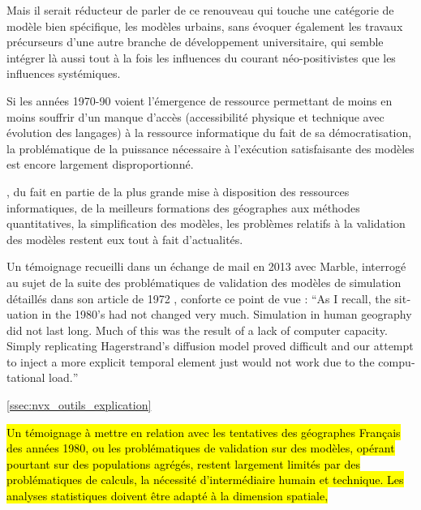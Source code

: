 Mais il serait réducteur de parler de ce renouveau qui touche une catégorie de modèle bien spécifique, les modèles urbains, sans évoquer également les travaux précurseurs d'une autre branche de développement universitaire, qui semble intégrer là aussi tout à la fois les influences du courant néo-positivistes que les influences systémiques. %

Si les années 1970-90 voient l'émergence de ressource permettant de moins en moins souffrir d'un manque d'accès (accessibilité physique et technique avec évolution des langages) à la ressource informatique du fait de sa démocratisation, la problématique de la puissance nécessaire à l’exécution satisfaisante des modèles est encore largement disproportionné. 

, du fait en partie de la plus grande mise à disposition des ressources informatiques, de la meilleurs formations des géographes aux méthodes quantitatives, la simplification des modèles, les problèmes relatifs à la validation des modèles restent eux tout à fait d'actualités. 

Un témoignage recueilli dans un échange de mail en 2013 avec Marble, interrogé au sujet de la suite des problématiques de validation des modèles de simulation détaillés dans son article de 1972 \autocite{Marble1972}, conforte ce point de vue : \foreignquote{english}{As I recall, the situation in the 1980's had not changed very much. Simulation in human geography did not last long. Much of this was the result of a lack of computer capacity. Simply replicating Hagerstrand's diffusion model proved difficult and our attempt to inject a more explicit temporal element just would not work due to the computational load.}

\ref{ssec:nvx_outils_explication}

\hl{Un témoignage à mettre en relation avec les tentatives des géographes Français des années 1980, ou les problématiques de validation sur des modèles, opérant pourtant sur des populations agrégés, restent largement limités par des problématiques de calculs, la nécessité d'intermédiaire humain et technique. Les analyses statistiques doivent être adapté à la dimension spatiale,} %


